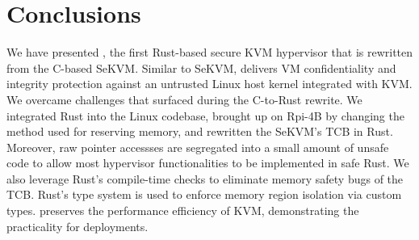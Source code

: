 
\chapter{Conclusions}
\label{sec:conclusions}

We have presented \rustsec{}, the first Rust-based secure KVM hypervisor that
is rewritten from the C-based SeKVM.
Similar to SeKVM, \rustsec{} delivers VM confidentiality and integrity
protection against an untrusted Linux host kernel integrated with KVM.
We overcame challenges that surfaced during the C-to-Rust rewrite. We
integrated Rust into the Linux codebase, brought up \rustsec{} on Rpi-4B by
changing the method used for reserving memory, and rewritten the SeKVM's TCB in
Rust. Moreover, raw pointer accessses are segregated into a small amount of
unsafe code to allow most hypervisor functionalities to be implemented in safe
Rust. We also leverage Rust's compile-time checks to eliminate memory safety
bugs of the TCB. Rust's type system is used to enforce memory region isolation
via custom types.
\rustsec{} preserves the performance efficiency of KVM, demonstrating the
practicality for deployments.

